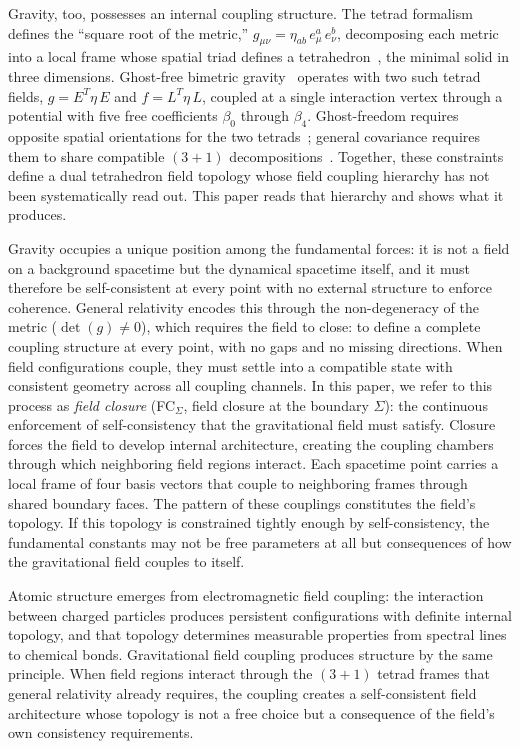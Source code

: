 \documentclass[aps,prd,preprint,superscriptaddress,showpacs,preprintnumbers,amsmath,amssymb,nofootinbib]{revtex4-2}
\begin{document}
Gravity, too, possesses an internal coupling structure. The tetrad formalism~\cite{mtw1973,wald1984} defines the ``square root of the metric,'' $g_{\mu\nu} = \eta_{ab}\,e^a_\mu\,e^b_\nu$, decomposing each metric into a local frame whose spatial triad defines a tetrahedron~\cite{barbieri1998}, the minimal solid in three dimensions. Ghost-free bimetric gravity~\cite{hassan2012,hinterbichler2012} operates with two such tetrad fields, $g = E^T\eta\,E$ and $f = L^T\eta\,L$, coupled at a single interaction vertex through a potential with five free coefficients $\beta_0$ through $\beta_4$. Ghost-freedom requires opposite spatial orientations for the two tetrads~\cite{alexander2014}; general covariance requires them to share compatible $(3{+}1)$ decompositions~\cite{hassankocic2018}. Together, these constraints define a dual tetrahedron field topology whose field coupling hierarchy has not been systematically read out. This paper reads that hierarchy and shows what it produces.

Gravity occupies a unique position among the fundamental forces: it is not a field on a background spacetime but the dynamical spacetime itself, and it must therefore be self-consistent at every point with no external structure to enforce coherence. General relativity encodes this through the non-degeneracy of the metric ($\det(g) \neq 0$), which requires the field to close: to define a complete coupling structure at every point, with no gaps and no missing directions. When field configurations couple, they must settle into a compatible state with consistent geometry across all coupling channels. In this paper, we refer to this process as \emph{field closure} (FC$_{\Sigma}$, field closure at the boundary $\Sigma$): the continuous enforcement of self-consistency that the gravitational field must satisfy. Closure forces the field to develop internal architecture, creating the coupling chambers through which neighboring field regions interact. Each spacetime point carries a local frame of four basis vectors that couple to neighboring frames through shared boundary faces. The pattern of these couplings constitutes the field's topology. If this topology is constrained tightly enough by self-consistency, the fundamental constants may not be free parameters at all but consequences of how the gravitational field couples to itself.

Atomic structure emerges from electromagnetic field coupling: the interaction between charged particles produces persistent configurations with definite internal topology, and that topology determines measurable properties from spectral lines to chemical bonds. Gravitational field coupling produces structure by the same principle. When field regions interact through the $(3{+}1)$ tetrad frames that general relativity already requires, the coupling creates a self-consistent field architecture whose topology is not a free choice but a consequence of the field's own consistency requirements.
\end{document}
